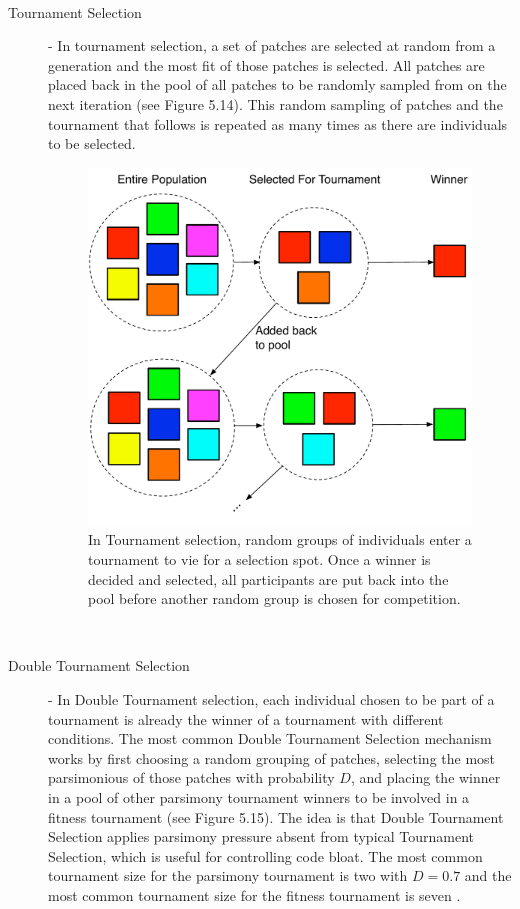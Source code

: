 \documentclass[a4paper,12pt]{report} 	%
\numberwithin{figure}{chapter}
\numberwithin{table}{chapter}
\numberwithin{equation}{chapter}
\begin{document}
\begin{flushleft}
\begin{description}
\begin{figure}[h!]
\begin{center}
\end{center}
\end{figure}
\\
\item [Tournament Selection] - In tournament selection, a set of patches are selected at random from a generation and the most fit of those patches is selected. All patches are placed back in the pool of all patches to be randomly sampled from on the next iteration (see Figure 5.14). This random sampling of patches and the tournament that follows is repeated as many times as there are individuals to be selected.
\begin{figure}[h!]
\begin{center}
\includegraphics[scale = 0.6]{TournamentSelection}
\caption[Tournament Selection]{In Tournament selection, random groups of individuals enter a tournament to vie for a selection spot. Once a winner is decided and selected, all participants are put back into the pool before another random group is chosen for competition.}
\end{center}
\end{figure}
\\
\item [Double Tournament Selection] - In Double Tournament selection, each individual chosen to be part of a tournament is already the winner of a tournament with different conditions. The most common Double Tournament Selection mechanism works by first choosing a random grouping of patches, selecting the most parsimonious of those patches with probability $D$, and placing the winner in a pool of other parsimony tournament winners to be involved in a fitness tournament (see Figure 5.15). The idea is that Double Tournament Selection applies parsimony pressure absent from typical Tournament Selection, which is useful for controlling code bloat. The most common tournament size for the parsimony tournament is two with $D = 0.7$ and the most common tournament size for the fitness tournament is seven \cite[p. 21]{luke2006comparison}.

\end{description}
\end{flushleft}
\end{document}
